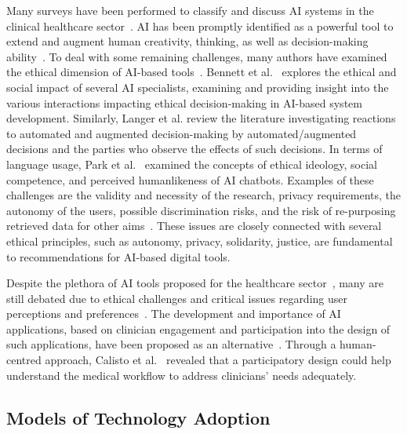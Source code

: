 Many surveys have been performed to classify and discuss AI systems in the clinical healthcare sector~\cite{CORONATO2020101964, LANGER2021106878, PELAU2021106855, STADIN2021106486}.
AI has been promptly identified as a powerful tool to extend and augment human creativity, thinking, as well as decision-making ability~\cite{CORONATO2020101964}.
To deal with some remaining challenges, many authors have examined the ethical dimension of AI-based tools~\cite{10.1145/3311957.3361858, LANGER2021106878, PARK2021106795}.
Bennett et al.~\cite{10.1145/3311957.3361858} explores the ethical and social impact of several AI specialists, examining and providing insight into the various interactions impacting ethical decision-making in AI-based system development.
Similarly, Langer et al. review the literature investigating reactions to automated and augmented decision-making by automated/augmented decisions and the parties who observe the effects of such decisions.
In terms of language usage, Park et al.~\cite{PARK2021106795} examined the concepts of ethical ideology, social competence, and perceived humanlikeness of AI chatbots.
Examples of these challenges are the validity and necessity of the research, privacy requirements, the autonomy of the users, possible discrimination risks, and the risk of re-purposing retrieved data for other aims~\cite{DEANGELI2020102412}.
These issues are closely connected with several ethical principles, such as autonomy, privacy, solidarity, justice, are fundamental to recommendations for AI-based digital tools.

Despite the plethora of AI tools proposed for the healthcare sector~\cite{kohli2018cad, madani2018deep, McKinney2020, sundaram2018predicting}, many are still debated due to ethical challenges and critical issues regarding user perceptions and preferences~\cite{Fan2020, Sutton2020}.
The development and importance of AI applications, based on clinician engagement and participation into the design of such applications, have been proposed as an alternative~\cite{Cai:2019:HTC:3290605.3300234, CALISTO2021102607, Oh:2018:ILY:3173574.3174223, Sousa:2017:VVR:3025453.3025566}.
Through a human-centred approach, Calisto et al.~\cite{CALISTO2021102607} revealed that a participatory design could help understand the medical workflow to address clinicians' needs adequately.

\subsection{Models of Technology Adoption}
\label{sec:chap004002003}

